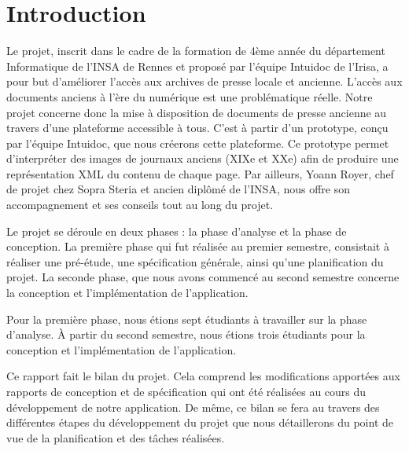 \section{Introduction}
\label{sec:intro}

Le projet, inscrit dans le cadre de la formation de 4ème année du département Informatique de l’INSA de Rennes et proposé par l’équipe Intuidoc de l’Irisa, a pour but d’améliorer l’accès aux archives de presse locale et ancienne. L’accès aux documents anciens à l’ère du numérique est une problématique réelle. Notre projet concerne donc la mise à disposition de documents de presse ancienne au travers d’une plateforme accessible à tous. C’est à partir d’un prototype, conçu par l’équipe Intuidoc, que nous créerons cette plateforme.
Ce prototype permet d’interpréter des images de journaux anciens (XIXe et XXe) afin de produire une représentation XML du contenu de chaque page. Par ailleurs, Yoann Royer, chef de projet chez Sopra Steria et ancien diplômé de l’INSA, nous offre son accompagnement et ses conseils tout au long du projet.

Le projet se déroule en deux phases : la phase d'analyse et la phase de conception. La première phase qui fut réalisée au premier semestre, consistait à réaliser une pré-étude, une spécification générale, ainsi qu'une planification  du projet. La seconde phase, que nous avons commencé au second semestre concerne la conception et l'implémentation de l'application. 

Pour la première phase, nous étions sept étudiants à travailler sur la phase d'analyse. À partir du second semestre, nous étions trois étudiants pour la conception et l'implémentation de l'application.

Ce rapport fait le bilan du projet. Cela comprend les modifications apportées aux rapports de conception\cite{Conc} et de spécification\cite{Specs} qui ont été réalisées au cours du développement de notre application. De même, ce bilan se fera au travers des différentes étapes du développement du projet que nous détaillerons du point de vue de la planification et des tâches réalisées.
